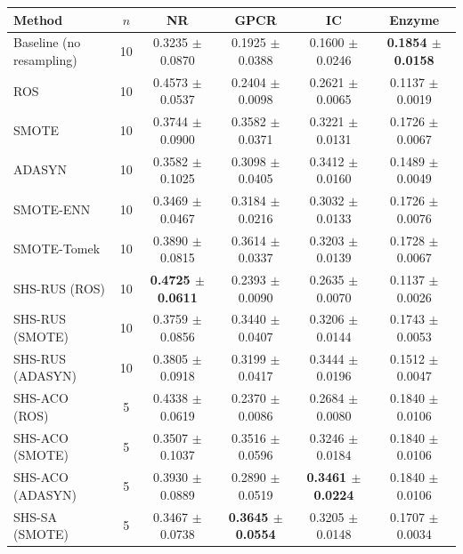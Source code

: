 \begin{tabular}{lccccc}
\toprule
Method & $n$ & NR & GPCR & IC & Enzyme \\
\midrule
Baseline (no resampling) & 10 & 0.3235 $\pm$ 0.0870 & 0.1925 $\pm$ 0.0388 & 0.1600 $\pm$ 0.0246 & \textbf{0.1854 $\pm$ 0.0158} \\
ROS & 10 & 0.4573 $\pm$ 0.0537 & 0.2404 $\pm$ 0.0098 & 0.2621 $\pm$ 0.0065 & 0.1137 $\pm$ 0.0019 \\
SMOTE & 10 & 0.3744 $\pm$ 0.0900 & 0.3582 $\pm$ 0.0371 & 0.3221 $\pm$ 0.0131 & 0.1726 $\pm$ 0.0067 \\
ADASYN & 10 & 0.3582 $\pm$ 0.1025 & 0.3098 $\pm$ 0.0405 & 0.3412 $\pm$ 0.0160 & 0.1489 $\pm$ 0.0049 \\
SMOTE-ENN & 10 & 0.3469 $\pm$ 0.0467 & 0.3184 $\pm$ 0.0216 & 0.3032 $\pm$ 0.0133 & 0.1726 $\pm$ 0.0076 \\
SMOTE-Tomek & 10 & 0.3890 $\pm$ 0.0815 & 0.3614 $\pm$ 0.0337 & 0.3203 $\pm$ 0.0139 & 0.1728 $\pm$ 0.0067 \\
SHS-RUS (ROS) & 10 & \textbf{0.4725 $\pm$ 0.0611} & 0.2393 $\pm$ 0.0090 & 0.2635 $\pm$ 0.0070 & 0.1137 $\pm$ 0.0026 \\
SHS-RUS (SMOTE) & 10 & 0.3759 $\pm$ 0.0856 & 0.3440 $\pm$ 0.0407 & 0.3206 $\pm$ 0.0144 & 0.1743 $\pm$ 0.0053 \\
SHS-RUS (ADASYN) & 10 & 0.3805 $\pm$ 0.0918 & 0.3199 $\pm$ 0.0417 & 0.3444 $\pm$ 0.0196 & 0.1512 $\pm$ 0.0047 \\
SHS-ACO (ROS) & 5 & 0.4338 $\pm$ 0.0619 & 0.2370 $\pm$ 0.0086 & 0.2684 $\pm$ 0.0080 & 0.1840 $\pm$ 0.0106 \\
SHS-ACO (SMOTE) & 5 & 0.3507 $\pm$ 0.1037 & 0.3516 $\pm$ 0.0596 & 0.3246 $\pm$ 0.0184 & 0.1840 $\pm$ 0.0106 \\
SHS-ACO (ADASYN) & 5 & 0.3930 $\pm$ 0.0889 & 0.2890 $\pm$ 0.0519 & \textbf{0.3461 $\pm$ 0.0224} & 0.1840 $\pm$ 0.0106 \\
SHS-SA (SMOTE) & 5 & 0.3467 $\pm$ 0.0738 & \textbf{0.3645 $\pm$ 0.0554} & 0.3205 $\pm$ 0.0148 & 0.1707 $\pm$ 0.0034 \\
\bottomrule
\end{tabular}
